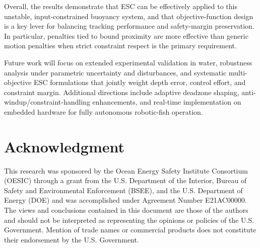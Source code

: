 ﻿\documentclass[subscriptcorrection,upint,varvw,barcolor=Goldenrod3,mathalfa=cal=euler,balance,hyphenate,french,pdf-a]{asmejour}
\begin{document}
Overall, the results demonstrate that ESC can be effectively applied to this unstable, input-constrained buoyancy system, and that objective-function design is a key lever for balancing tracking performance and safety-margin preservation. In particular, penalties tied to bound proximity are more effective than generic motion penalties when strict constraint respect is the primary requirement.

Future work will focus on extended experimental validation in water, robustness analysis under parametric uncertainty and disturbances, and systematic multi-objective ESC formulations that jointly weight depth error, control effort, and constraint margin. Additional directions include adaptive deadzone shaping, anti-windup/constraint-handling enhancements, and real-time implementation on embedded hardware for fully autonomous robotic-fish operation.

\section*{Acknowledgment}
This research was sponsored by the Ocean Energy Safety Institute Consortium (OESIC) through a grant from the U.S. Department of the Interior, Bureau of Safety and Environmental Enforcement (BSEE), and the U.S. Department of Energy (DOE) and was accomplished under Agreement Number E21AC00000. The views and conclusions contained in this document are those of the authors and should not be interpreted as representing the opinions or policies of the U.S. Government. Mention of trade names or commercial products does not constitute their endorsement by the U.S. Government.
\end{document}
